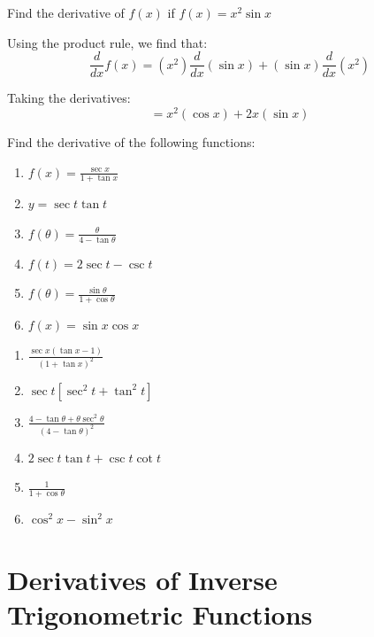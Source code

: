\begin{Worked}
\begin{Problem}
Find the derivative of $f(x)$ if $f(x) = x^2\sin{x}$
\end{Problem}
\begin{Solution}
Using the product rule, we find that:
$$\frac{d}{dx}f(x)=(x^2)\frac{d}{dx}(\sin{x})+(\sin{x})\frac{d}{dx}(x^2)$$

Taking the derivatives:
$$=x^2(\cos{x})+2x(\sin{x})$$
\end{Solution}
\end{Worked}

\begin{Exercise}[title = Derivatives of trig functions, label=trigderiv2]
    Find the derivative of the following functions:
    \begin{enumerate}
        \item $f(x) = \frac{\sec{x}}{1+\tan{x}}$
        \item $y=\sec{t}\tan{t}$
        \item $f(\theta) = \frac{\theta}{4-\tan{\theta}}$
        \item $f(t) = 2\sec{t} - \csc{t}$
        \item $f(\theta) = \frac{\sin{\theta}}{1+\cos{\theta}}$
        \item $f(x) = \sin{x}\cos{x}$
    \end{enumerate}
\end{Exercise}

\begin{Answer}
    [ref=trigderiv2]
    \begin{enumerate}
        \item $\frac{\sec{x}(\tan{x}-1)}{(1+\tan{x})^2}$
        \item $\sec{t}[\sec^2{t}+\tan^2{t}]$
        \item $\frac{4-\tan{\theta}+\theta \sec^2{\theta}}{(4-\tan{\theta})^2}$
        \item $2\sec{t}\tan{t}+\csc{t}\cot{t}$
        \item $\frac{1}{1+\cos{\theta}}$
        \item $\cos^2{x} - \sin^2{x}$
    \end{enumerate}
\end{Answer}

\section{Derivatives of Inverse Trigonometric Functions}

